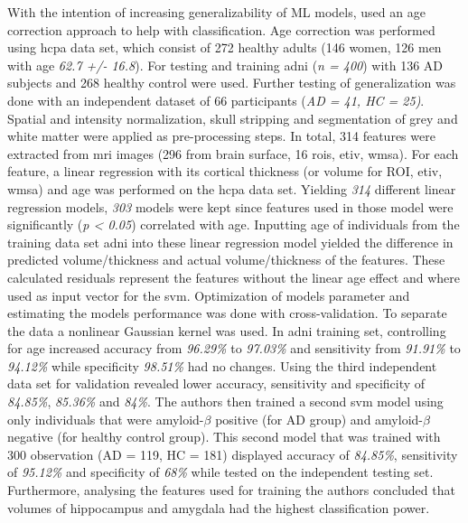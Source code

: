 With the intention of increasing generalizability of \gls{ML} models, \textcite{liPredictionClinicalBiomarker2020} used an age correction approach to help with classification. Age correction was performed using \gls{hcpa} data set, which consist of 272 healthy adults (146 women, 126 men with age \textit{62.7 +/- 16.8}). For testing and training  \gls{adni} (\textit{n = 400}) with 136 AD subjects and 268 healthy control were used. Further testing of generalization was done with an independent dataset of 66 participants (\textit{AD = 41, HC = 25)}. Spatial and intensity normalization, skull stripping and segmentation of grey and white matter were applied as pre-processing steps. In total, 314 features were extracted from \gls{mri} images (296 from brain surface, 16 \gls{roi}s, \gls{etiv}, \gls{wmsa}). For each feature, a linear regression with its cortical thickness (or volume for \gls{ROI}, \gls{etiv}, \gls{wmsa}) and age was performed on the \gls{hcpa} data set. Yielding \textit{314} different linear regression models, \textit{303} models were kept since features used in those model were significantly (\textit{p < 0.05}) correlated with age. Inputting age of individuals from the training data set \gls{adni} into these linear regression model yielded the difference in  predicted volume/thickness and actual volume/thickness of the features. These calculated residuals represent the features without the linear age effect and where used as input vector for the \gls{svm}. Optimization of models parameter and estimating the models performance was done with cross-validation. To separate the data a nonlinear Gaussian kernel was used. In \gls{adni} training set, controlling for age increased accuracy from \textit{96.29\%} to \textit{97.03\%} and sensitivity from \textit{91.91\%} to \textit{94.12\%} while specificity \textit{98.51\%} had no changes. Using the third independent data set for validation revealed lower accuracy, sensitivity and specificity of \textit{84.85\%}, \textit{85.36\%} and \textit{84\%}. The authors then trained a second \gls{svm} model using only individuals that were amyloid-$\beta$ positive (for \gls{AD} group) and amyloid-$\beta$ negative (for healthy control group). This second model that was trained with 300 observation (\gls{AD} = 119, HC = 181) displayed accuracy of \textit{84.85\%}, sensitivity of \textit{95.12\%} and specificity of \textit{68\%} while tested on the independent testing set. Furthermore, analysing the features used for training the authors concluded that volumes of hippocampus and amygdala had the highest classification power. 



